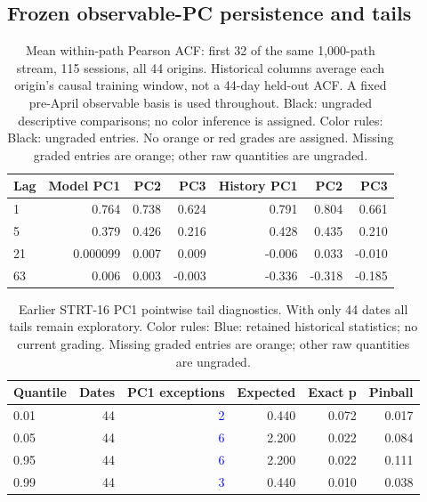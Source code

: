 \documentclass[11pt]{article}
\begin{document}
\subsection{Frozen observable-PC persistence and tails}

\begin{table}[H]\centering\small\setlength{\tabcolsep}{4pt}
\caption{Mean within-path Pearson ACF: first 32 of the same 1,000-path stream, 115 sessions, all 44 origins. Historical columns average each origin's causal training window, not a 44-day held-out ACF. A fixed pre-April observable basis is used throughout. Black: ungraded descriptive comparisons; no color inference is assigned. Color rules: Black: ungraded entries. No orange or red grades are assigned. Missing graded entries are orange; other raw quantities are ungraded.}\label{tab:current-acf}
\begin{tabular}{@{}lrrrrrr@{}}
\toprule
Lag & Model PC1 & PC2 & PC3 & History PC1 & PC2 & PC3 \\
\midrule
1 & 0.764 & 0.738 & 0.624 & 0.791 & 0.804 & 0.661 \\
5 & 0.379 & 0.426 & 0.216 & 0.428 & 0.435 & 0.210 \\
21 & 0.000099 & 0.007 & 0.009 & -0.006 & 0.033 & -0.010 \\
63 & 0.006 & 0.003 & -0.003 & -0.336 & -0.318 & -0.185 \\
\bottomrule\end{tabular}\end{table}

\begin{table}[H]\centering\small\setlength{\tabcolsep}{4pt}
\caption{Earlier STRT-16 PC1 pointwise tail diagnostics. With only 44 dates all tails remain exploratory. Color rules: Blue: retained historical statistics; no current grading. Missing graded entries are orange; other raw quantities are ungraded.}\label{tab:current-tails}
\begin{tabular}{@{}lrrrrr@{}}
\toprule
Quantile & Dates & PC1 exceptions & Expected & Exact p & Pinball \\
\midrule
0.01 & 44 & \textcolor{blue}{2} & 0.440 & 0.072 & 0.017 \\
0.05 & 44 & \textcolor{blue}{6} & 2.200 & 0.022 & 0.084 \\
0.95 & 44 & \textcolor{blue}{6} & 2.200 & 0.022 & 0.111 \\
0.99 & 44 & \textcolor{blue}{3} & 0.440 & 0.010 & 0.038 \\
\bottomrule\end{tabular}\end{table}
\end{document}
